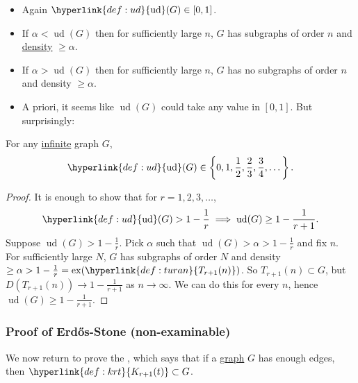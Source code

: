 \documentclass{article}
\DeclareMathOperator{\ext}{ex}
\DeclareMathOperator{\ud}{ud}
\begin{document}
\begin{remark}
    \leavevmode
    \begin{itemize}
        \item Again $\hyperlink{def:ud}{\ud}(G) \in [0, 1]$.
        \item If $\alpha < \ud(G)$ then for sufficiently large $n$, $G$ has subgraphs of order $n$ and \hyperlink{def:density}{density} $\geq \alpha$.
        \item If $\alpha > \ud(G)$ then for sufficiently large $n$, $G$ has no subgraphs of order $n$ and density $\geq \alpha$.
        \item A priori, it seems like $\ud(G)$ could take any value in $[0, 1]$. But surprisingly:
    \end{itemize}
\end{remark}

\begin{ncor}
    For any \hyperlink{def:infGraph}{infinite} graph $G$,
    \begin{equation*}
        \hyperlink{def:ud}{\ud}(G) \in \left\{0, 1, \frac{1}{2}, \frac{2}{3}, \frac{3}{4}, \dotsc\right\}.
    \end{equation*}
\end{ncor}

\begin{proof}
    It is enough to show that for $r = 1, 2, 3, \dotsc$,
    \begin{equation*}
        \hyperlink{def:ud}{\ud}(G) > 1 - \frac{1}{r} \implies \ud(G) \geq 1 - \frac{1}{r+1}.
    \end{equation*}
    Suppose $\ud(G) > 1 - \frac{1}{r}$.
    Pick $\alpha$ such that $\ud(G) > \alpha > 1 - \frac{1}{r}$ and fix $n$.
    For sufficiently large $N$, $G$ has subgraphs of order $N$ and density $\geq \alpha > 1 - \frac{1}{r} = \ext(\hyperlink{def:turan}{T_{r+1}(n)})$.
    So $T_{r+1}(n) \subset G$, but $D(T_{r+1}(n)) \to 1 - \frac{1}{r+1}$ as $n \to \infty$.
    We can do this for every $n$, hence $\ud(G) \geq 1 - \frac{1}{r+1}$.
\end{proof}

\subsubsection{Proof of Erd\H{o}s-Stone (non-examinable)}\label{sec:es}
We now return to prove the , which says that if a \hyperlink{def:graph}{graph} $G$ has enough edges, then $\hyperlink{def:krt}{K_{r+1}(t)} \subset G$.
\end{document}
